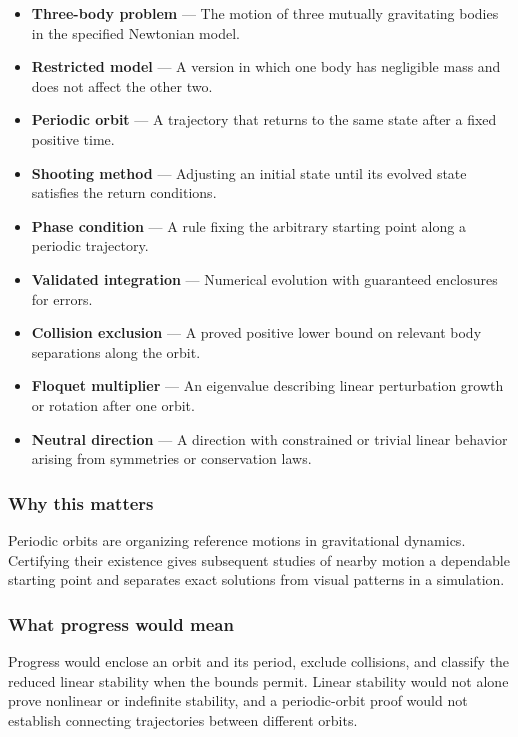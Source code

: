 \documentclass[
  11pt,
]{article}
\begin{document}
\begin{itemize}
\item
  \textbf{Three-body problem} --- The motion of three mutually
  gravitating bodies in the specified Newtonian model.
\item
  \textbf{Restricted model} --- A version in which one body has
  negligible mass and does not affect the other two.
\item
  \textbf{Periodic orbit} --- A trajectory that returns to the same
  state after a fixed positive time.
\item
  \textbf{Shooting method} --- Adjusting an initial state until its
  evolved state satisfies the return conditions.
\item
  \textbf{Phase condition} --- A rule fixing the arbitrary starting
  point along a periodic trajectory.
\item
  \textbf{Validated integration} --- Numerical evolution with guaranteed
  enclosures for errors.
\item
  \textbf{Collision exclusion} --- A proved positive lower bound on
  relevant body separations along the orbit.
\item
  \textbf{Floquet multiplier} --- An eigenvalue describing linear
  perturbation growth or rotation after one orbit.
\item
  \textbf{Neutral direction} --- A direction with constrained or trivial
  linear behavior arising from symmetries or conservation laws.
\end{itemize}

\subsubsection{Why this matters}

Periodic orbits are organizing reference motions in gravitational
dynamics. Certifying their existence gives subsequent studies of nearby
motion a dependable starting point and separates exact solutions from
visual patterns in a simulation.

\subsubsection{What progress would mean}

Progress would enclose an orbit and its period, exclude collisions, and
classify the reduced linear stability when the bounds permit. Linear
stability would not alone prove nonlinear or indefinite stability, and a
periodic-orbit proof would not establish connecting trajectories between
different orbits.
\end{document}

